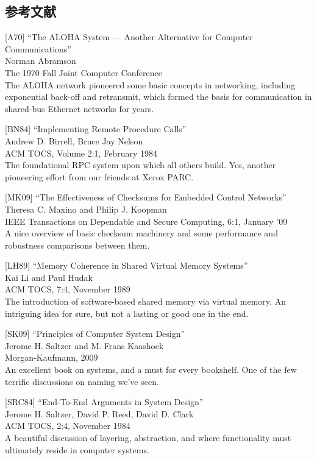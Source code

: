 \hypertarget{ux53c2ux8003ux6587ux732e-33}{%
\subsection*{参考文献}\label{ux53c2ux8003ux6587ux732e-33}}

{[}A70{]} ``The ALOHA System --- Another Alternative for Computer
Communications''\\
Norman Abramson\\
The 1970 Fall Joint Computer Conference\\
The ALOHA network pioneered some basic concepts in networking, including
exponential back-off and retransmit, which formed the basis for
communication in shared-bus Ethernet networks for years.

{[}BN84{]} ``Implementing Remote Procedure Calls''\\
Andrew D. Birrell, Bruce Jay Nelson\\
ACM TOCS, Volume 2:1, February 1984\\
The foundational RPC system upon which all others build. Yes, another
pioneering effort from our friends at Xerox PARC.

{[}MK09{]} ``The Effectiveness of Checksums for Embedded Control
Networks''\\
Theresa C. Maxino and Philip J. Koopman\\
IEEE Transactions on Dependable and Secure Computing, 6:1, January '09\\
A nice overview of basic checksum machinery and some performance and
robustness comparisons between them.

{[}LH89{]} ``Memory Coherence in Shared Virtual Memory Systems''\\
Kai Li and Paul Hudak\\
ACM TOCS, 7:4, November 1989\\
The introduction of software-based shared memory via virtual memory. An
intriguing idea for sure, but not a lasting or good one in the end.

{[}SK09{]} ``Principles of Computer System Design''\\
Jerome H. Saltzer and M. Frans Kaashoek\\
Morgan-Kaufmann, 2009\\
An excellent book on systems, and a must for every bookshelf. One of the
few terrific discussions on naming we've seen.

{[}SRC84{]} ``End-To-End Arguments in System Design''\\
Jerome H. Saltzer, David P. Reed, David D. Clark\\
ACM TOCS, 2:4, November 1984\\
A beautiful discussion of layering, abstraction, and where functionality
must ultimately reside in computer systems.

